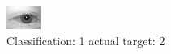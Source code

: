 \begin{figure}[h!]
\begin{center}
\includegraphics[width=0.60\columnwidth]{figures/ID451_class_1_target_2.png}
\end{center}
\caption{ Classification: 1 actual target: 2}
\label{fig:ID451_class_1_target_2}
\end{figure}
